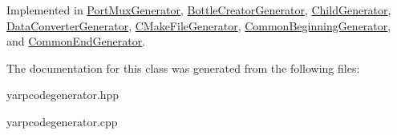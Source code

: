 Implemented in \hyperlink{classPortMuxGenerator_a0f740d798c16c0dee5de7b6fbace3c53}{Port\-Mux\-Generator}, \hyperlink{classBottleCreatorGenerator_a71d28a76d750bcfa2de6f62f8b9b5a62}{Bottle\-Creator\-Generator}, \hyperlink{classChildGenerator_a2dd3b214edfe346d16c8c2cdc708cc52}{Child\-Generator}, \hyperlink{classDataConverterGenerator_a1c3df6e22d230512a9091184f315b9ef}{Data\-Converter\-Generator}, \hyperlink{classCMakeFileGenerator_a5505ce5e4f9397e616f521e70f56f9d7}{C\-Make\-File\-Generator}, \hyperlink{classCommonBeginningGenerator_a34d951b06ae3658659b2c76e3bbb1413}{Common\-Beginning\-Generator}, and \hyperlink{classCommonEndGenerator_a08904bf31bed7b708155b354ab33e272}{Common\-End\-Generator}.



The documentation for this class was generated from the following files\-:\begin{DoxyCompactItemize}
\item 
yarpcodegenerator.\-hpp\item 
yarpcodegenerator.\-cpp\end{DoxyCompactItemize}
